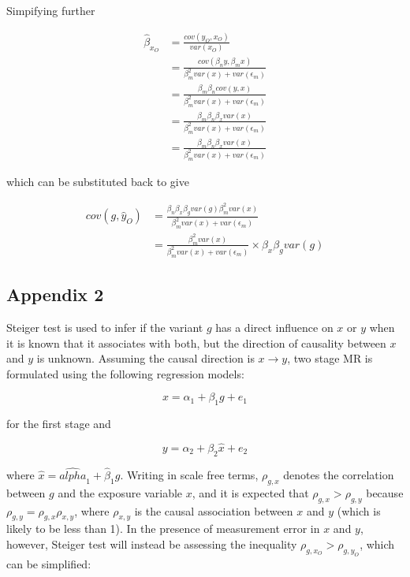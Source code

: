 \documentclass[]{article}
\begin{document}
Simpifying further

\[
\begin{aligned}
\hat{\beta}_{x_O} & = \frac{cov(y_O, x_O)} {var(x_O)} \\
                  & = \frac{cov(\beta_n y, \beta_m x)} {\beta_m^2 var(x) + var(\epsilon_m)} \\
                  & = \frac{\beta_m \beta_n cov(y, x)} {\beta_m^2 var(x) + var(\epsilon_m)} \\
                  & = \frac{\beta_m \beta_n \beta_x var(x)} {\beta_m^2 var(x) + var(\epsilon_m)} \\
                  & = \frac{\beta_m \beta_n \beta_x var(x)} {\beta_m^2 var(x) + var(\epsilon_m)}
\end{aligned}
\]

which can be substituted back to give

\[
\begin{aligned}
cov(g, \hat{y}_O) & = \frac{\beta_n \beta_x \beta_g var(g) \beta_m^2 var(x)} {\beta_m^2 var(x) + var(\epsilon_m)} \\
                & = \frac{\beta_m^2 var(x)} {\beta_m^2 var(x) + var(\epsilon_m)} \times \beta_x\beta_g var(g)
\end{aligned}
\]

\newpage

\subsection{Appendix 2}\label{appendix-2}

Steiger test is used to infer if the variant $g$ has a direct influence
on $x$ or $y$ when it is known that it associates with both, but the
direction of causality between $x$ and $y$ is unknown. Assuming the
causal direction is $x \to y$, two stage MR is formulated using the
following regression models:

\[
x = \alpha_1 + \beta_1 g + e_1
\]

for the first stage and

\[
y = \alpha_2 + \beta_2 \hat{x} + e_2
\]

where $\hat{x} = \hat{alpha}_1 + \hat{\beta}_1 g$. Writing in scale free
terms, $\rho_{g, x}$ denotes the correlation between $g$ and the
exposure variable $x$, and it is expected that
$\rho_{g, x} > \rho_{g, y}$ because
$\rho_{g, y} = \rho_{g, x}\rho_{x, y}$, where $\rho_{x, y}$ is the
causal association between $x$ and $y$ (which is likely to be less than
1). In the presence of measurement error in $x$ and $y$, however,
Steiger test will instead be assessing the inequality
$\rho_{g, x_O} > \rho_{g, y_O}$, which can be simplified:
\end{document}
